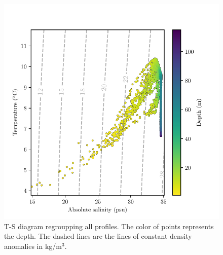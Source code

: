 \documentclass[12pt,a4paper]{article}
\begin{document}
\begin{figure}[h]
  \centering
  \includegraphics{ts}
  \caption{\label{fig:ts}T-S diagram regroupping all profiles. The color
    of points represents the depth.
    The dashed lines are the lines of constant density anomalies in kg/m$^3$.}
\end{figure}
\end{document}
